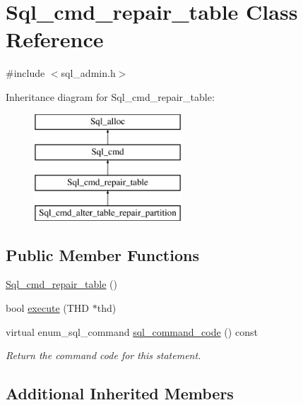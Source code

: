 \hypertarget{classSql__cmd__repair__table}{}\section{Sql\+\_\+cmd\+\_\+repair\+\_\+table Class Reference}
\label{classSql__cmd__repair__table}


{\ttfamily \#include $<$sql\+\_\+admin.\+h$>$}

Inheritance diagram for Sql\+\_\+cmd\+\_\+repair\+\_\+table\+:\begin{figure}[H]
\begin{center}
\leavevmode
\includegraphics[height=4.000000cm]{classSql__cmd__repair__table}
\end{center}
\end{figure}
\subsection*{Public Member Functions}
\begin{DoxyCompactItemize}
\item 
\mbox{\hyperlink{classSql__cmd__repair__table_ac8c64e909a1a1ec2421255418694b65c}{Sql\+\_\+cmd\+\_\+repair\+\_\+table}} ()
\item 
bool \mbox{\hyperlink{classSql__cmd__repair__table_abb68d28756b9713e0d46774b3cafe39c}{execute}} (T\+HD $\ast$thd)
\item 
\mbox{\label{classSql__cmd__repair__table_ad181a9b7e0b954781f289c7c8bc1a71a}} 
virtual enum\+\_\+sql\+\_\+command \mbox{\hyperlink{classSql__cmd__repair__table_ad181a9b7e0b954781f289c7c8bc1a71a}{sql\+\_\+command\+\_\+code}} () const
\begin{DoxyCompactList}\small\item\em Return the command code for this statement. \end{DoxyCompactList}\end{DoxyCompactItemize}
\subsection*{Additional Inherited Members}


